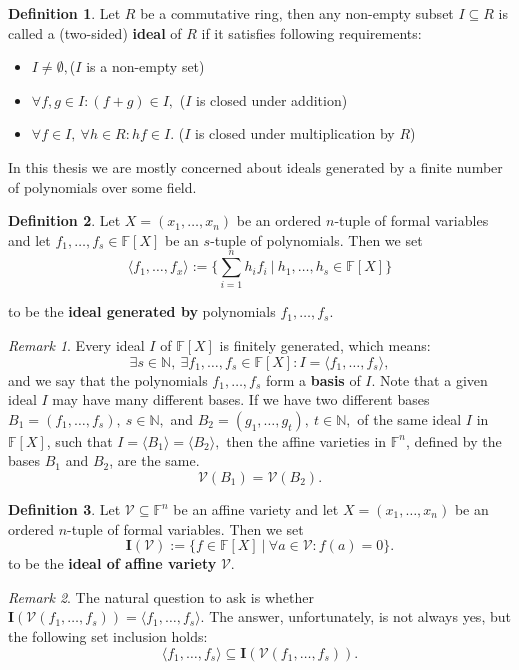 \documentclass[thesis=M,english]{FITthesis}[2012/10/20]
\theoremstyle{remark}
\newtheorem*{RM}{Remark}
\theoremstyle{definition}
\newtheorem{DF}{Definition}[section]
\begin{document}
 \begin{DF}
Let $R$ be a commutative ring, then any non-empty subset $I \subseteq R$ is called a (two-sided) \textbf{ideal} of $R$ if it satisfies following requirements:
\begin{itemize}
\item $I \neq \emptyset,$\hfill ($I$ is a non-empty set)
\item $\forall f,g \in I: (f + g) \in I,$ \hfill ($I$ is closed under addition)
\item $\forall f \in I,\ \forall h \in R: hf \in I.$ \hfill ($I$ is closed under multiplication by $R$)
\end{itemize}
\end{DF}
\noindent In this thesis we are mostly concerned about ideals generated by a finite number of polynomials over some field.
\begin{DF}
Let $X = (x_1, \ldots ,x_n)$ be an ordered $n$-tuple of formal variables and let $f_1,\ldots,f_s \in \mathbb{F}[X] $ be an $s$-tuple of polynomials. Then we set
$$
\langle f_1, \ldots, f_x \rangle := \{ \sum_{i=1}^n h_if_i\ |\ h_1,\ldots,h_s \in \mathbb{F}[X]\}
$$
\end{DF}
\noindent to be the \textbf{ideal generated by} polynomials $f_1,\ldots,f_s$.
\begin{RM}
Every ideal $I$ of $\mathbb{F}[X]$ is finitely generated, which means:
$$
\exists s \in \mathbb{N},\ \exists f_1,\ldots,f_s \in \mathbb{F}[X]: I = \langle f_1, \ldots, f_s \rangle,
$$
\noindent and we say that the polynomials $f_1,\ldots,f_s$ form a \textbf{basis} of $I$. Note that a given ideal $I$ may have many different bases. If we have two different bases $B_1 = (f_1,\ldots,f_s),\ s \in \mathbb{N},$ and $B_2 = (g_1, \ldots, g_t),\ t \in \mathbb{N},$ of the same ideal $I$ in $\mathbb{F}[X]$, such that $I = \langle B_1\rangle = \langle B_2 \rangle,$ then the affine varieties ${\text{in }\mathbb{F}^n}$, defined by the bases $B_1$ and $B_2$, are the same.
$$
\mathcal{V}(B_1) = \mathcal{V}(B_2).
$$
\end{RM}
\begin{DF}
Let $\mathcal{V} \subseteq \mathbb{F}^n$ be an affine variety and let $X = (x_1, \ldots ,x_n)$ be an ordered $n$-tuple of formal variables. Then we set 
$$
\mathbf{I}(\mathcal{V}) := \{ f \in \mathbb{F}[X]\ |\ \forall a \in \mathcal{V}: f(a) = 0\}.
$$
\noindent to be the \textbf{ideal of affine variety} $\mathcal{V}$.
\end{DF}
\begin{RM}
The natural question to ask is whether $\mathbf{I}(\mathcal{V}(f_1,\ldots,f_s)) = \langle f_1,\ldots,f_s \rangle.$ The answer, unfortunately, is not always yes, but the following set inclusion holds:
$$
\langle f_1,\ldots,f_s \rangle \subseteq \mathbf{I}(\mathcal{V}(f_1,\ldots,f_s)) .
$$
\end{RM} 
\end{document}
